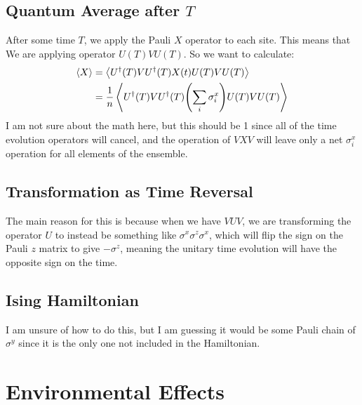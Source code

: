 \documentclass[12pt]{article}
\begin{document}
\subsection{Quantum Average after $T$}
After some time $T$, we apply the Pauli $X$ operator to each site. This means that We are applying operator $U(T)VU(T)$. So we want to calculate:
\begin{align*}
  \ev{X}&=\ev{U^\dag(T)VU^\dag(T)X(t)U(T)VU(T)}\\
  &=\frac1n\ev{U^\dag(T)VU^\dag(T)\qty(\sum_i\sigma_i^x)U(T)VU(T)}
\end{align*}
I am not sure about the math here, but this should be 1 since all of the time evolution operators will cancel, and the operation of $VXV$ will leave only a net $\sigma^x_i$ operation for all elements of the ensemble.

\subsection{Transformation as Time Reversal}
The main reason for this is because when we have $VUV$, we are transforming the operator $U$ to instead be something like $\sigma^x\sigma^z\sigma^x$, which will flip the sign on the Pauli $z$ matrix to give $-\sigma^z$, meaning the unitary time evolution will have the opposite sign on the time.

\subsection{Ising Hamiltonian}
I am unsure of how to do this, but I am guessing it would be some Pauli chain of $\sigma^y$ since it is the only one not included in the Hamiltonian.

\section{Environmental Effects}
\end{document}
